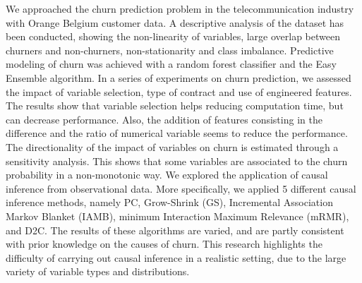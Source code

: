 We approached the churn prediction problem in the telecommunication industry
with Orange Belgium customer data. A descriptive analysis of the dataset has
been conducted, showing the non-linearity of variables, large overlap between
churners and non-churners, non-stationarity and class imbalance. Predictive
modeling of churn was achieved with a random forest classifier and the Easy
Ensemble algorithm. In a series of experiments on churn prediction, we assessed
the impact of variable selection, type of contract and use of engineered
features. The results show that variable selection helps reducing computation
time, but can decrease performance. Also, the addition of features consisting in
the difference and the ratio of numerical variable seems to reduce the
performance. The directionality of the impact of variables on churn is estimated
through a sensitivity analysis. This shows that some variables are associated to
the churn probability in a non-monotonic way. We explored the application of
causal inference from observational data. More specifically, we applied 5
different causal inference methods, namely PC, Grow-Shrink (GS), Incremental
Association Markov Blanket (IAMB), minimum Interaction Maximum Relevance (mRMR),
and D2C. The results of these algorithms are varied, and are partly consistent
with prior knowledge on the causes of churn. This research highlights the
difficulty of carrying out causal inference in a realistic setting, due to the
large variety of variable types and distributions.
